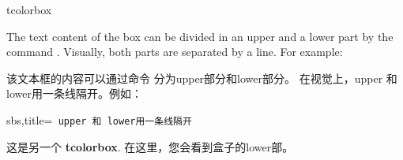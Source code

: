 \begin{docEnvironment}{tcolorbox}{}

The text content of the box can be divided
in an upper and a lower part
by the command . Visually, both parts are separated by a line.
For example:

该文本框的内容可以通过命令  分为upper部分和lower部分。 在视觉上，upper 和 lower用一条线隔开。例如：






\begin{dispExample*}{sbs,title={\tt{~}\hfill upper 和 lower用一条线隔开\hfill{~}}}
\begin{tcolorbox}
这是另一个 \textbf{tcolorbox}.
\tcblower
在这里，您会看到盒子的lower部。
\end{tcolorbox}  
\end{dispExample*}


\end{docEnvironment}
